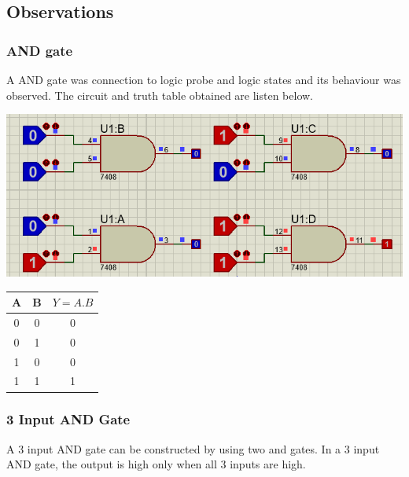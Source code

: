 \documentclass[a4paper, 12pt]{article}
\begin{document}
\subsection{Observations}

\subsubsection{AND gate}
A AND gate was connection to logic probe and logic states and its behaviour was observed.
The circuit and truth table obtained are listen below. \\

\begin{minipage}[c]{.7\textwidth}
  \centering
  \includegraphics[scale=0.5]{and}
\end{minipage}
\begin{minipage}{.3\textwidth}
  \begin{center}
    \begin{tabular}{ |c|c|c| }
      \hline
      A & B & $Y=A.B$ \\
      \hline
      0 & 0 & 0 \\
      \hline
      0 & 1 & 0 \\
      \hline
      1 & 0 & 0 \\
      \hline
      1 & 1 & 1 \\
      \hline
    \end{tabular}
  \end{center}
\end{minipage}

\subsubsection{3 Input AND Gate}
A 3 input AND gate can be constructed by using two and gates. In a 3 input AND gate, the output is high only when all 3 inputs are high.
\end{document}
